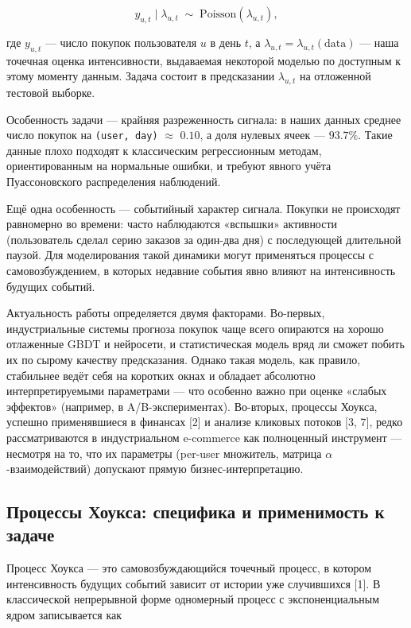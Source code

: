 \documentclass[12pt,a4paper]{article}
\begin{document}
\[
y_{u,t} \mid \lambda_{u,t} \;\sim\; \mathrm{Poisson}(\lambda_{u,t}),
\]

где $y_{u,t}$ --- число покупок пользователя $u$ в день $t$, а $\lambda _{u,t} = \lambda _{u,t}(\text{data})$ --- наша точечная оценка интенсивности, выдаваемая некоторой моделью по доступным к этому моменту данным. Задача состоит в предсказании $\lambda _{u,t}$ на отложенной тестовой выборке.

Особенность задачи --- крайняя разреженность сигнала: в наших данных среднее число покупок на \texttt{(user, day)} $\approx$ $0.10$, а доля нулевых ячеек --- $93.7\%$. Такие данные плохо подходят к классическим регрессионным методам, ориентированным на нормальные ошибки, и требуют явного учёта Пуассоновского распределения наблюдений.

Ещё одна особенность --- событийный характер сигнала. Покупки не происходят равномерно во времени: часто наблюдаются «вспышки» активности (пользователь сделал серию заказов за один-два дня) с последующей длительной паузой. Для моделирования такой динамики могут применяться процессы с самовозбуждением, в которых недавние события явно влияют на интенсивность будущих событий.

Актуальность работы определяется двумя факторами. Во-первых, индустриальные системы прогноза покупок чаще всего опираются на хорошо отлаженные GBDT и нейросети, и статистическая модель вряд ли сможет побить их по сырому качеству предсказания. Однако такая модель, как правило, стабильнее ведёт себя на коротких окнах и обладает абсолютно интерпретируемыми параметрами --- что особенно важно при оценке «слабых эффектов» (например, в A/B-экспериментах). Во-вторых, процессы Хоукса, успешно применявшиеся в финансах [2] и анализе кликовых потоков [3, 7], редко рассматриваются в индустриальном e-commerce как полноценный инструмент --- несмотря на то, что их параметры (per-user множитель, матрица $\alpha$-взаимодействий) допускают прямую бизнес-интерпретацию.

\FloatBarrier
\subsection{Процессы Хоукса: специфика и применимость к задаче}

Процесс Хоукса --- это самовозбуждающийся точечный процесс, в котором интенсивность будущих событий зависит от истории уже случившихся [1]. В классической непрерывной форме одномерный процесс с экспоненциальным ядром записывается как
\end{document}
